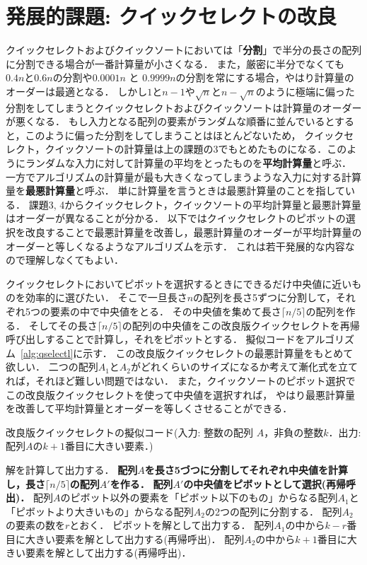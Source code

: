 \documentclass[a4paper,twoside,onecolumn,openany,article]{memoir}
\theoremstyle{remark}
\begin{document}
\section*{発展的課題: クイックセレクトの改良}
クイックセレクトおよびクイックソートにおいては「\textbf{分割}」で半分の長さの配列に分割できる場合が一番計算量が小さくなる．
また，厳密に半分でなくても$0.4 n$と$0.6n$の分割や$0.0001 n$ と $0.9999 n$の分割を常にする場合，やはり計算量のオーダーは最適となる．
しかし$1$と$n-1$や$\sqrt{n}$と$n-\sqrt{n}$のように極端に偏った分割をしてしまうとクイックセレクトおよびクイックソートは計算量のオーダーが悪くなる．
もし入力となる配列の要素がランダムな順番に並んでいるとすると，このように偏った分割をしてしまうことはほとんどないため，
クイックセレクト，クイックソートの計算量は上の課題の3でもとめたものになる．このようにランダムな入力に対して計算量の平均をとったものを\textbf{平均計算量}と呼ぶ．
一方でアルゴリズムの計算量が最も大きくなってしまうような入力に対する計算量を\textbf{最悪計算量}と呼ぶ．
単に計算量を言うときは最悪計算量のことを指している．
課題3, 4からクイックセレクト，クイックソートの平均計算量と最悪計算量はオーダーが異なることが分かる．
以下ではクイックセレクトのピボットの選択を改良することで最悪計算量を改善し，最悪計算量のオーダーが平均計算量のオーダーと等しくなるようなアルゴリズムを示す．
これは若干発展的な内容なので理解しなくてもよい．

クイックセレクトにおいてピボットを選択するときにできるだけ中央値に近いものを効率的に選びたい．
そこで一旦長さ$n$の配列を長さ5ずつに分割して，それぞれ5つの要素の中で中央値をとる．
その中央値を集めて長さ$\lceil n/5\rceil$の配列を作る．
そしてその長さ$\lceil n/5\rceil$の配列の中央値をこの改良版クイックセレクトを再帰呼び出しすることで計算し，それをピボットとする．
擬似コードをアルゴリズム~\ref{alg:qselectl}に示す．
この改良版クイックセレクトの最悪計算量をもとめて欲しい．
二つの配列$A_1$と$A_2$がどれくらいのサイズになるか考えて漸化式を立てれば，それほど難しい問題ではない．
また，クイックソートのピボット選択でこの改良版クイックセレクトを使って中央値を選択すれば，
やはり最悪計算量を改善して平均計算量とオーダーを等しくさせることができる．


\begin{algorithm}
\caption{改良版クイックセレクトの擬似コード(入力: 整数の配列 $A$，非負の整数$k$．出力: 配列$A$の$k+1$番目に大きい要素．)}
\label{alg:qselectl}
\begin{algorithmic}
  \State 解を計算して出力する．
\Else
  \State \textbf{配列$A$を長さ5づつに分割してそれぞれ中央値を計算し，長さ$\lceil n/5\rceil$の配列$A'$を作る．}
  \State \textbf{配列$A'$の中央値をピボットとして選択(再帰呼出)．}
  \State 配列$A$のピボット以外の要素を「ピボット以下のもの」からなる配列$A_1$と「ピボットより大きいもの」からなる配列$A_2$の2つの配列に分割する．
  \State 配列$A_2$の要素の数を$r$とおく．
    \State ピボットを解として出力する．
    \State 配列$A_1$の中から$k-r$番目に大きい要素を解として出力する(再帰呼出)．
  \Else
    \State 配列$A_2$の中から$k+1$番目に大きい要素を解として出力する(再帰呼出)．
  \EndIf
\EndIf
\end{algorithmic}
\end{algorithm}
\end{document}
